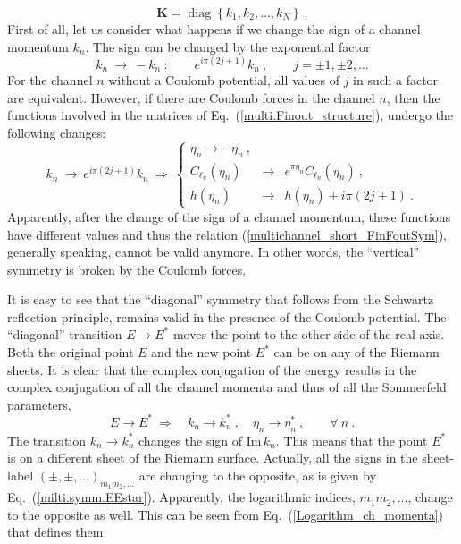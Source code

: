 \documentclass[12pt]{article}
\begin{document}
\begin{equation}
\label{multi.chmom}
   \bm{K}=\operatorname{diag}\left\{k_1,k_2,\dots,k_N\right\}\ .
\end{equation}
First of all, let us consider what happens if we change the sign of a channel 
momentum $k_n$. 
The sign can be changed by the exponential 
factor
\begin{equation}
\label{multi.C.signchange}
   k_n\ \to\ -k_n\ :
   \qquad
   e^{i\pi(2j+1)}k_n\ ,\qquad j=\pm1,\pm2,\dots
\end{equation}
For the channel $n$ without a Coulomb potential, all values of $j$ in such a
factor are equivalent. However, if there are Coulomb forces in the 
channel $n$, then the functions involved in the matrices of
Eq.~(\ref{multi.Finout_structure}), undergo the following changes: 
\begin{equation}
\label{multi.Coulomb.sign.change.matr}
   k_n\ \to\ e^{i\pi(2j+1)}k_n\ \Rightarrow\ \left\{
   \begin{array}{lcl}
   \eta_n\to -\eta_n\ ,\\[3mm]
   C_{\ell_n}(\eta_n) &\to& e^{\pi\eta_n}C_{\ell_n}(\eta_n)\ ,\\[3mm]
   h(\eta_n) &\to& h(\eta_n)+ i\pi(2j+1)\ .
   \end{array}\right.
\end{equation}
Apparently, after the change of the sign of a channel momentum, these functions 
have different values and thus the relation
(\ref{multichannel_short_FinFoutSym}), generally speaking, cannot be valid 
anymore. In other words, the ``vertical'' symmetry is broken by the Coulomb 
forces. 

It is easy to see that the ``diagonal'' symmetry that follows from the Schwartz 
reflection principle, remains valid in the presence of the Coulomb potential. 
The ``diagonal'' transition $E\to E^*$ moves the point to the other side of the 
real axis.  Both the original point $E$ and the new point $E^*$ can be on any 
of the Riemann sheets. It is clear that the complex conjugation of the energy 
results in the complex conjugation of all the channel momenta and thus of all 
the Sommerfeld parameters,
$$
   E\to E^*\ \Rightarrow\quad k_n\to k_n^*\ ,\quad \eta_n\to\eta_n^*\ ,
   \qquad \forall\ n\ .
$$
The transition $k_n\to k_n^*$ changes the sign of $\mathrm{Im}\,k_n$. This 
means that the point $E^*$ is on a different sheet of the Riemann surface. 
Actually, all the signs in the sheet-label $(\pm,\pm,\dots)_{m_1m_2,\dots}$ are 
changing to the opposite, as is given by Eq.~(\ref{milti.symm.EEstar}). 
Apparently, the logarithmic indices, $m_1m_2,\dots$, 
change to the opposite as well. This can be seen from 
Eq.~(\ref{Logarithm_ch_momenta}) that defines them.
\end{document}
